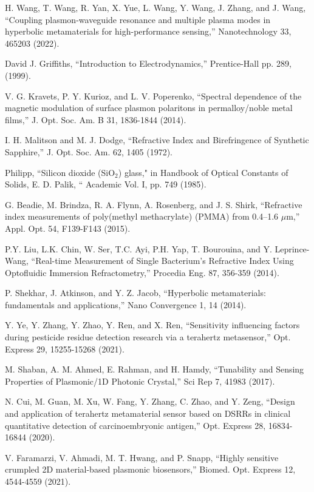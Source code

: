 \documentclass[conference]{IEEEtran}
\begin{document}
\begin{thebibliography}{00}
 H. Wang, T. Wang, R. Yan, X. Yue, L. Wang, Y. Wang, J. Zhang, and J. Wang, ``Coupling plasmon-waveguide resonance and multiple plasma modes in hyperbolic metamaterials for high-performance sensing,'' Nanotechnology 33, 465203 (2022).

 David J. Griffiths, ``Introduction to Electrodynamics,'' Prentice-Hall pp. 289, (1999). 

 V. G. Kravets, P. Y. Kurioz, and L. V. Poperenko, ``Spectral dependence of the magnetic modulation of surface plasmon polaritons in permalloy/noble metal films,'' J. Opt. Soc. Am. B 31, 1836-1844 (2014).

 I. H. Malitson and M. J. Dodge, ``Refractive Index and Birefringence of Synthetic Sapphire,'' J. Opt. Soc. Am. 62, 1405 (1972).

 Philipp, ``Silicon dioxide (SiO$_2$) glass," in Handbook of Optical Constants of Solids, E. D. Palik, `` Academic Vol. I, pp. 749 (1985).

 G. Beadie, M. Brindza, R. A. Flynn, A. Rosenberg, and J. S. Shirk, ``Refractive index measurements of poly(methyl methacrylate) (PMMA) from 0.4–1.6 $\mu$m,'' Appl. Opt. 54, F139-F143 (2015).


 P.Y. Liu, L.K. Chin, W. Ser, T.C. Ayi, P.H. Yap, T. Bourouina, and Y. Leprince-Wang, ``Real-time Measurement of Single Bacterium's Refractive Index Using Optofluidic Immersion Refractometry,'' Procedia Eng. 87, 356-359 (2014).


  P. Shekhar, J. Atkinson, and Y. Z. Jacob, ``Hyperbolic metamaterials: fundamentals and applications,'' Nano Convergence 1, 14 (2014).

 Y. Ye, Y. Zhang, Y. Zhao, Y. Ren, and X. Ren, ``Sensitivity influencing factors during pesticide residue detection research via a terahertz metasensor,'' Opt. Express 29, 15255-15268 (2021).

 M. Shaban, A. M. Ahmed, E. Rahman, and H. Hamdy, ``Tunability and Sensing Properties of Plasmonic/1D Photonic Crystal,'' Sci Rep 7, 41983 (2017).

 N. Cui, M. Guan, M. Xu, W. Fang, Y. Zhang, C. Zhao, and Y. Zeng, ``Design and application of terahertz metamaterial sensor based on DSRRs in clinical quantitative detection of carcinoembryonic antigen,'' Opt. Express 28, 16834-16844 (2020).

 V. Faramarzi, V. Ahmadi, M. T. Hwang, and P. Snapp, ``Highly sensitive crumpled 2D material-based plasmonic biosensors,'' Biomed. Opt. Express 12, 4544-4559 (2021).
\end{thebibliography}
\vspace{12pt}
\end{document}
